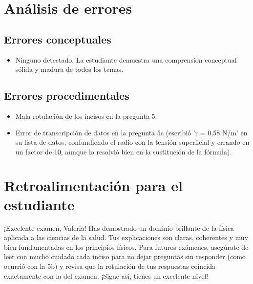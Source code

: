 \documentclass[11pt,a4paper]{article}
\begin{document}
\section*{Análisis de errores}

\subsection*{Errores conceptuales}
\begin{itemize}[leftmargin=1.5em, itemsep=2pt]
  \item Ninguno detectado. La estudiante demuestra una comprensión conceptual sólida y madura de todos los temas.
\end{itemize}

\subsection*{Errores procedimentales}
\begin{itemize}[leftmargin=1.5em, itemsep=2pt]
  \item Mala rotulación de los incisos en la pregunta 5.
  \item Error de transcripción de datos en la pregunta 5c (escribió 'r = 0,58 N/m' en su lista de datos, confundiendo el radio con la tensión superficial y errando en un factor de 10, aunque lo resolvió bien en la sustitución de la fórmula).
\end{itemize}

\section*{Retroalimentación para el estudiante}
\begin{tcolorbox}[cajaRecomendacion, title={Dirigido a: Valeria Marrero}]
¡Excelente examen, Valeria! Has demostrado un dominio brillante de la física aplicada a las ciencias de la salud. Tus explicaciones son claras, coherentes y muy bien fundamentadas en los principios físicos. Para futuros exámenes, asegúrate de leer con mucho cuidado cada inciso para no dejar preguntas sin responder (como ocurrió con la 5b) y revisa que la rotulación de tus respuestas coincida exactamente con la del examen. ¡Sigue así, tienes un excelente nivel!
\end{tcolorbox}

\end{document}
